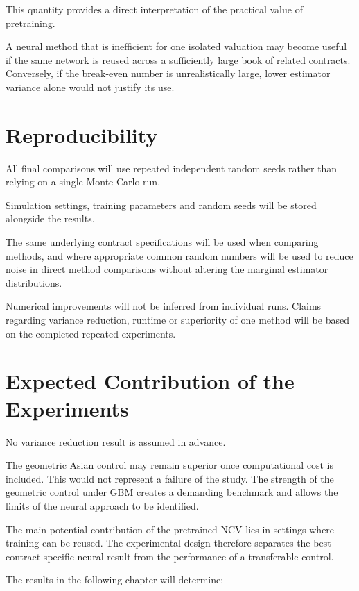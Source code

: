 \documentclass[12pt,a4paper]{report}
\begin{document}
This quantity provides a direct interpretation of the practical value of pretraining.

A neural method that is inefficient for one isolated valuation may become useful if the same network is reused across a sufficiently large book of related contracts. Conversely, if the break-even number is unrealistically large, lower estimator variance alone would not justify its use.

\section{Reproducibility}

All final comparisons will use repeated independent random seeds rather than relying on a single Monte Carlo run.

Simulation settings, training parameters and random seeds will be stored alongside the results.

The same underlying contract specifications will be used when comparing methods, and where appropriate common random numbers will be used to reduce noise in direct method comparisons without altering the marginal estimator distributions.

Numerical improvements will not be inferred from individual runs. Claims regarding variance reduction, runtime or superiority of one method will be based on the completed repeated experiments.

\section{Expected Contribution of the Experiments}

No variance reduction result is assumed in advance.

The geometric Asian control may remain superior once computational cost is included. This would not represent a failure of the study. The strength of the geometric control under GBM creates a demanding benchmark and allows the limits of the neural approach to be identified.

The main potential contribution of the pretrained NCV lies in settings where training can be reused. The experimental design therefore separates the best contract-specific neural result from the performance of a transferable control.

The results in the following chapter will determine:
\end{document}
